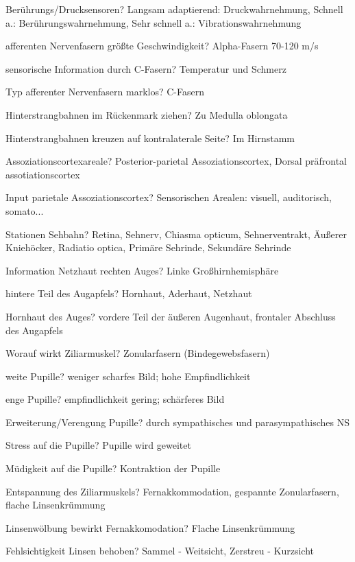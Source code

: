 \documentclass[a4paper]{article}
\begin{document}
\begin{multicols}{3}
  Berührungs/Drucksensoren? Langsam adaptierend: Druckwahrnehmung, Schnell a.: Berührungswahrnehmung, Sehr schnell a.: Vibrationswahrnehmung

  afferenten Nervenfasern größte Geschwindigkeit? Alpha-Fasern 70-120 m/s

  sensorische Information durch C-Fasern? Temperatur und Schmerz

  Typ afferenter Nervenfasern marklos? C-Fasern

  Hinterstrangbahnen im Rückenmark ziehen? Zu Medulla oblongata

  Hinterstrangbahnen kreuzen auf kontralaterale Seite? Im Hirnstamm

  Assoziationscortexareale? Posterior-parietal Assoziationscortex, Dorsal präfrontal assotiationscortex

  Input parietale Assoziationscortex? Sensorischen Arealen: visuell, auditorisch, somato...


  Stationen Sehbahn? Retina, Sehnerv, Chiasma opticum, Sehnerventrakt, Äußerer Kniehöcker, Radiatio optica, Primäre Sehrinde, Sekundäre Sehrinde

  Information Netzhaut rechten Auges? Linke Großhirnhemisphäre

  hintere Teil des Augapfels? Hornhaut, Aderhaut, Netzhaut

  Hornhaut des Auges? vordere Teil der äußeren Augenhaut, frontaler Abschluss des Augapfels

  Worauf wirkt Ziliarmuskel? Zonularfasern (Bindegewebsfasern)

  weite Pupille? weniger scharfes Bild; hohe Empfindlichkeit

  enge Pupille? empfindlichkeit gering; schärferes Bild

  Erweiterung/Verengung Pupille? durch sympathisches und parasympathisches NS

  Stress auf die Pupille? Pupille wird geweitet

  Müdigkeit auf die Pupille? Kontraktion der Pupille

  Entspannung des Ziliarmuskels? Fernakkommodation, gespannte Zonularfasern, flache Linsenkrümmung

  Linsenwölbung bewirkt Fernakkomodation? Flache Linsenkrümmung

  Fehlsichtigkeit Linsen behoben? Sammel - Weitsicht, Zerstreu - Kurzsicht


\end{multicols}
\end{document}
